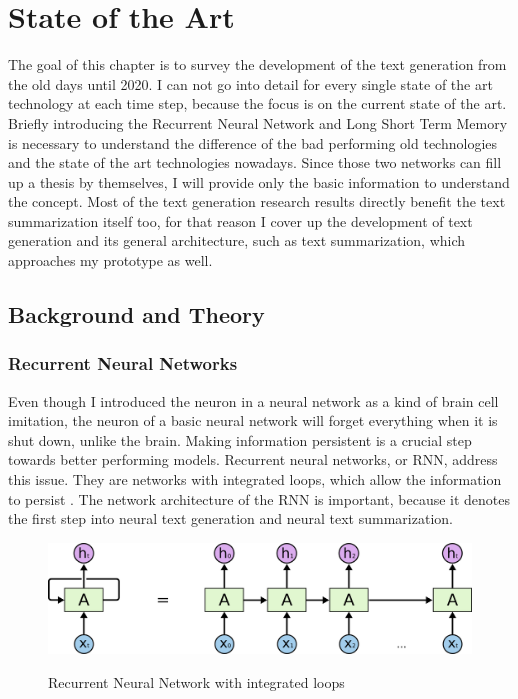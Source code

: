 \chapter{State of the Art}\label{ch:sota}

The goal of this chapter is to survey the development of the text generation from the old days until 2020. I can not go into detail for every single state of the art technology at each time step, because the focus is on the current state of the art. Briefly introducing the Recurrent Neural Network and Long Short Term Memory is necessary to understand the difference of the bad performing old technologies and the state of the art technologies nowadays. Since those two networks can fill up a thesis by themselves, I will provide only the basic information to understand the concept. Most of the text generation research results directly benefit the text summarization itself too, for that reason I cover up the development of text generation and its general architecture, such as text summarization, which approaches my prototype as well.  

\section{Background and Theory}

\subsection{Recurrent Neural Networks}
Even though I introduced the neuron in a neural network as a kind of brain cell imitation, the neuron of a basic neural network will forget everything when it is shut down, unlike the brain. Making information persistent is a crucial step towards better performing models. Recurrent neural networks, or RNN, address this issue. They are networks with integrated loops, which allow the information to persist \cite{olah}. The network architecture of the RNN is important, because it denotes the first step into neural text generation and neural text summarization. 

\begin{figure}
	\begin{center}
		\includegraphics[width=4.5in]{photos/RNN-unrolled}\\
		\caption{Recurrent Neural Network with integrated loops \cite{olah}}\label{rnn}
	\end{center}
\end{figure}

